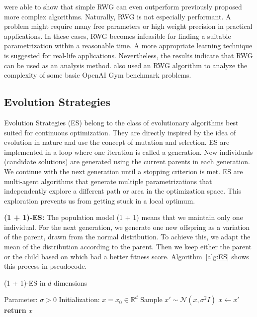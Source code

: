 \cite{schmidhuber2001evaluating} were able to show that simple RWG can even outperform previously proposed more complex algorithms. Naturally, RWG is not especially performant. A problem might require many free parameters or high weight precision in practical applications. In these cases, RWG becomes infeasible for finding a suitable parametrization within a reasonable time. A more appropriate learning technique is suggested for real-life applications. Nevertheless, the results indicate that RWG can be used as an analysis method. \cite{oller_analyzing_2020} also used an RWG algorithm to analyze the complexity of some basic OpenAI Gym benchmark problems.

\subsection{Evolution Strategies}
Evolution Strategies (ES) belong to the class of evolutionary algorithms best suited for continuous optimization. They are directly inspired by the idea of evolution in nature and use the concept of mutation and selection. ES are implemented in a loop where one iteration is called a generation. New individuals (candidate solutions) are generated using the current parents in each generation. We continue with the next generation until a stopping criterion is met. ES are multi-agent algorithms that generate multiple parametrizations that independently explore a different path or area in the optimization space. This exploration prevents us from getting stuck in a local optimum.

\textbf{(1 + 1)-ES:} The population model (1 + 1) means that we maintain only one individual. For the next generation, we generate one new offspring as a variation of the parent, drawn from the normal distribution. To achieve this, we adapt the mean of the distribution according to the parent. Then we keep either the parent or the child based on which had a better fitness score. Algorithm~\ref{alg:ES} shows this process in pseudocode.
\begin{algorithm}
\caption{(1 + 1)-ES in $d$ dimensions}
\begin{algorithmic}[1]
\State Parameter: $\sigma > 0$
\State Initialization: $x = x_0 \in \mathbb{R}^d$
    \State Sample $x' \sim \mathcal{N}(x, \sigma^2 I)$
      \State $x \leftarrow x'$
    \EndIf
\EndWhile
\State \textbf{return} $x$
\end{algorithmic}
\label{alg:ES}
\end{algorithm}

